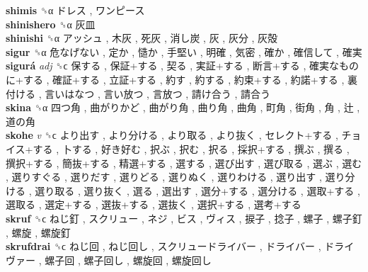 \textbf{shimis} ␝α   ドレス ,  ワンピース   \\
\textbf{shinishero} ␝α   灰皿   \\
\textbf{shinishi} ␝α   アッシュ ,  木灰 ,  死灰 ,  消し炭 ,  灰 ,  灰分 ,  灰殻   \\
\textbf{sigur} ␝α   危なげない ,  定か ,  慥か ,  手堅い ,  明確 ,  気密 ,  確か ,  確信して ,  確実   \\
\textbf{sigurá} \emph{adj}  ␝ϲ   保する ,  保証+する ,  契る ,  実証+する ,  断言+する ,  確実なものに+する ,  確証+する ,  立証+する ,  約す ,  約する ,  約束+する ,  約諾+する ,  裏付ける ,  言いはなつ ,  言い放つ ,  言放つ ,  請け合う ,  請合う   \\
\textbf{skina} ␝α   四つ角 ,  曲がりかど ,  曲がり角 ,  曲り角 ,  曲角 ,  町角 ,  街角 ,  角 ,  辻 ,  道の角   \\
\textbf{skohe} \emph{v}  ␝ϲ   より出す ,  より分ける ,  より取る ,  より抜く ,  セレクト+する ,  チョイス+する ,  卜する ,  好き好む ,  択ぶ ,  択む ,  択る ,  採択+する ,  撰ぶ ,  撰る ,  撰択+する ,  簡抜+する ,  精選+する ,  選する ,  選び出す ,  選び取る ,  選ぶ ,  選む ,  選りすぐる ,  選りだす ,  選りどる ,  選りぬく ,  選りわける ,  選り出す ,  選り分ける ,  選り取る ,  選り抜く ,  選る ,  選出す ,  選分+する ,  選分ける ,  選取+する ,  選取る ,  選定+する ,  選抜+する ,  選抜く ,  選択+する ,  選考+する   \\
\textbf{skruf} ␝ϲ   ねじ釘 ,  スクリュー ,  ネジ ,  ビス ,  ヴィス ,  捩子 ,  捻子 ,  螺子 ,  螺子釘 ,  螺旋 ,  螺旋釘   \\
\textbf{skrufdrai} ␝ϲ   ねじ回 ,  ねじ回し ,  スクリュードライバー ,  ドライバー ,  ドライヴァー ,  螺子回 ,  螺子回し ,  螺旋回 ,  螺旋回し   \\

